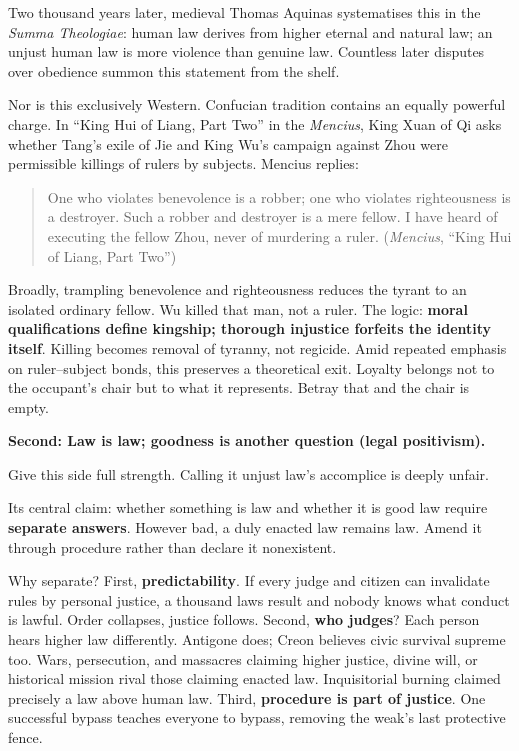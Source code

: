 Two thousand years later, medieval Thomas Aquinas systematises this in the \textit{Summa Theologiae}: human law derives from higher eternal and natural law; an unjust human law is more violence than genuine law. Countless later disputes over obedience summon this statement from the shelf.

Nor is this exclusively Western. Confucian tradition contains an equally powerful charge. In ``King Hui of Liang, Part Two'' in the \textit{Mencius}, King Xuan of Qi asks whether Tang's exile of Jie and King Wu's campaign against Zhou were permissible killings of rulers by subjects. Mencius replies:

\begin{quote}
One who violates benevolence is a robber; one who violates righteousness is a destroyer. Such a robber and destroyer is a mere fellow. I have heard of executing the fellow Zhou, never of murdering a ruler. (\textit{Mencius}, ``King Hui of Liang, Part Two'')
\end{quote}
Broadly, trampling benevolence and righteousness reduces the tyrant to an isolated ordinary fellow. Wu killed that man, not a ruler. The logic: \textbf{moral qualifications define kingship; thorough injustice forfeits the identity itself}. Killing becomes removal of tyranny, not regicide. Amid repeated emphasis on ruler--subject bonds, this preserves a theoretical exit. Loyalty belongs not to the occupant's chair but to what it represents. Betray that and the chair is empty.

\textbf{Second: Law is law; goodness is another question (legal positivism).}

Give this side full strength. Calling it unjust law's accomplice is deeply unfair.

Its central claim: whether something is law and whether it is good law require \textbf{separate answers}. However bad, a duly enacted law remains law. Amend it through procedure rather than declare it nonexistent.

Why separate? First, \textbf{predictability}. If every judge and citizen can invalidate rules by personal justice, a thousand laws result and nobody knows what conduct is lawful. Order collapses, justice follows. Second, \textbf{who judges}? Each person hears higher law differently. Antigone does; Creon believes civic survival supreme too. Wars, persecution, and massacres claiming higher justice, divine will, or historical mission rival those claiming enacted law. Inquisitorial burning claimed precisely a law above human law. Third, \textbf{procedure is part of justice}. One successful bypass teaches everyone to bypass, removing the weak's last protective fence.

